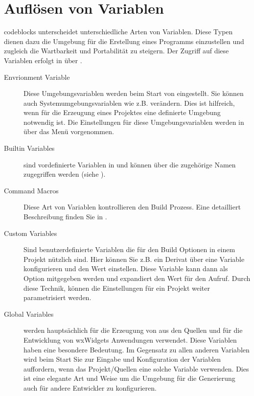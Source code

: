 \chapter{Auflösen von Variablen}\label{sec:variables_types}

codeblocks unterscheidet unterschiedliche Arten von Variablen. Diese Typen dienen dazu die Umgebung für die Erstellung eines Programms einzustellen und zugleich die Wartbarkeit und Portabilität zu steigern. Der Zugriff auf diese Variablen erfolgt in \codeblocks über .


\begin{description}
\item[Envrionment Variable] Diese Umgebungsvariablen werden beim Start von \codeblocks eingestellt. Sie können auch Systemumgebungsvariablen wie z.B.  verändern. Dies ist hilfreich, wenn für die Erzeugung eines Projektes eine definierte Umgebung notwendig ist. Die Einstellungen für diese Umgebungsvariablen werden in \codeblocks über das Menü  vorgenommen.
\item[Builtin Variables] sind vordefinierte Variablen in \codeblocks und können über die zugehörige Namen zugegriffen werden (siehe ).
\item[Command Macros] Diese Art von Variablen kontrollieren den Build Prozess. Eine detailliert Beschreibung finden Sie in .
\item[Custom Variables] Sind benutzerdefinierte Variablen die für den Build Optionen in einem Projekt nützlich sind. Hier können Sie z.B. ein Derivat über eine Variable  konfigurieren und den Wert einstellen. Diese Variable kann dann als Option  mitgegeben werden und \codeblocks expandiert den Wert für den Aufruf. Durch diese Technik, können die Einstellungen für ein Projekt weiter parametrisiert werden.
\item[Global Variables] werden hauptsächlich für die Erzeugung von \codeblocks aus den Quellen und für die Entwicklung von wxWidgets Anwendungen verwendet. Diese Variablen haben eine besondere Bedeutung. Im Gegensatz zu allen anderen Variablen wird \codeblocks beim Start Sie zur Eingabe und Konfiguration der Variablen auffordern, wenn das Projekt/Quellen eine solche Variable verwenden. Dies ist eine elegante Art und Weise um die Umgebung für die Generierung auch für andere Entwickler zu konfigurieren.
\end{description}

